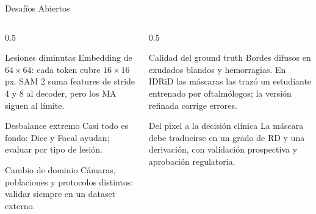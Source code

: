 \documentclass[aspectratio=169, 10pt]{beamer}
\begin{document}
\begin{frame}{Desaf\'ios Abiertos}

	\begin{columns}[T]
		\begin{column}{0.5\textwidth}
			\begin{block}{Lesiones diminutas}
				\small
				Embedding de $64 \times 64$: cada token cubre $16 \times 16$ px. SAM 2 suma features de stride 4 y 8 al decoder, pero los MA siguen al l\'imite.
			\end{block}
			\begin{block}{Desbalance extremo}
				\small
				Casi todo es fondo: Dice y Focal ayudan; evaluar por tipo de lesi\'on.
			\end{block}
			\begin{block}{Cambio de dominio}
				\small
				C\'amaras, poblaciones y protocolos distintos: validar siempre en un dataset externo.
			\end{block}
		\end{column}

		\begin{column}{0.5\textwidth}
			\begin{block}{Calidad del ground truth}
				\small
				Bordes difusos en exudados blandos y hemorragias. En IDRiD las m\'ascaras las traz\'o un estudiante entrenado por oftalm\'ologos; la versi\'on refinada corrige errores.
			\end{block}
			\begin{alertblock}{Del pixel a la decisi\'on cl\'inica}
				\small
				La m\'ascara debe traducirse en un grado de RD y una derivaci\'on, con validaci\'on prospectiva y aprobaci\'on regulatoria.
			\end{alertblock}
		\end{column}
	\end{columns}

\end{frame}
\end{document}
